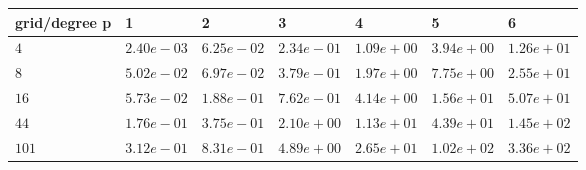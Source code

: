 \begin{tabular}{lllllll}
\hline
 grid/degree p   & 1          & 2          & 3          & 4          & 5          & 6          \\
\hline
 $4$             & $2.40e-03$ & $6.25e-02$ & $2.34e-01$ & $1.09e+00$ & $3.94e+00$ & $1.26e+01$ \\
 $8$             & $5.02e-02$ & $6.97e-02$ & $3.79e-01$ & $1.97e+00$ & $7.75e+00$ & $2.55e+01$ \\
 $16$            & $5.73e-02$ & $1.88e-01$ & $7.62e-01$ & $4.14e+00$ & $1.56e+01$ & $5.07e+01$ \\
 $44$            & $1.76e-01$ & $3.75e-01$ & $2.10e+00$ & $1.13e+01$ & $4.39e+01$ & $1.45e+02$ \\
 $101$           & $3.12e-01$ & $8.31e-01$ & $4.89e+00$ & $2.65e+01$ & $1.02e+02$ & $3.36e+02$ \\
\hline
\end{tabular}